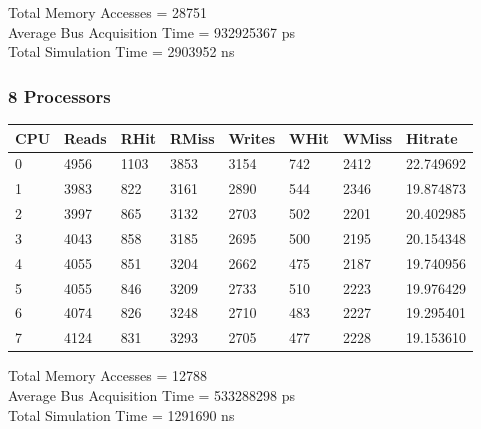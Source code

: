 \documentclass[]{article}
\begin{document}
Total Memory Accesses = 28751\\
Average Bus Acquisition Time = 932925367 ps\\
Total Simulation Time = 2903952 ns\\

\subsubsection{8 Processors}

\begin{table}[H]
	\begin{tabular}{|l|l|l|l|l|l|l|l|}
		\hline
		\textbf{CPU} & \textbf{Reads} & \textbf{RHit} & \textbf{RMiss} & \textbf{Writes} & \textbf{WHit} & \textbf{WMiss} & \textbf{Hitrate} \\ \hline
		0            & 4956           & 1103          & 3853           & 3154            & 742           & 2412           & 22.749692        \\ \hline
		1            & 3983           & 822           & 3161           & 2890            & 544           & 2346           & 19.874873        \\ \hline
		2            & 3997           & 865           & 3132           & 2703            & 502           & 2201           & 20.402985        \\ \hline
		3            & 4043           & 858           & 3185           & 2695            & 500           & 2195           & 20.154348        \\ \hline
		4            & 4055           & 851           & 3204           & 2662            & 475           & 2187           & 19.740956        \\ \hline
		5            & 4055           & 846           & 3209           & 2733            & 510           & 2223           & 19.976429        \\ \hline
		6            & 4074           & 826           & 3248           & 2710            & 483           & 2227           & 19.295401        \\ \hline
		7            & 4124           & 831           & 3293           & 2705            & 477           & 2228           & 19.153610        \\ \hline
	\end{tabular}
\end{table}

Total Memory Accesses = 12788\\
Average Bus Acquisition Time = 533288298 ps\\
Total Simulation Time = 1291690 ns\\
\end{document}
